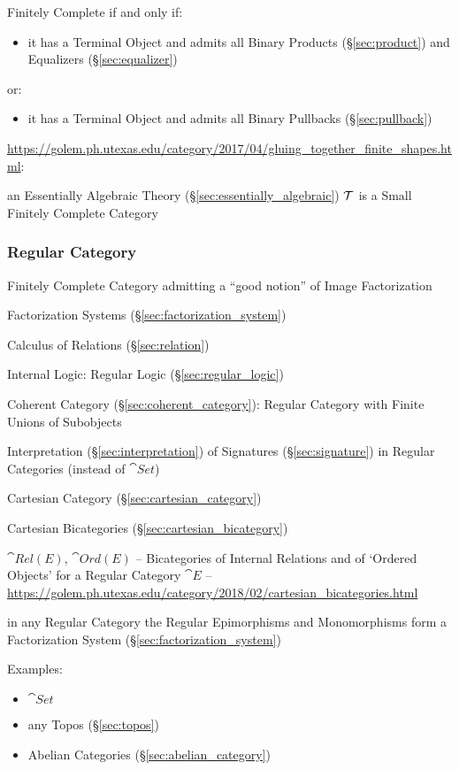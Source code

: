 Finitely Complete if and only if:
\begin{itemize}
  \item it has a Terminal Object and admits all Binary Products
    (\S\ref{sec:product}) and Equalizers (\S\ref{sec:equalizer})
\end{itemize}
or:
\begin{itemize}
  \item it has a Terminal Object and admits all Binary Pullbacks
    (\S\ref{sec:pullback})
\end{itemize}

\url{https://golem.ph.utexas.edu/category/2017/04/gluing_together_finite_shapes.html}:

an Essentially Algebraic Theory (\S\ref{sec:essentially_algebraic})
$\mathcal{T}$ is a Small Finitely Complete Category



\subsubsection{Regular Category}\label{sec:regular_category}

Finitely Complete Category admitting a ``good notion'' of Image
Factorization

\fist Factorization Systems (\S\ref{sec:factorization_system})

Calculus of Relations (\S\ref{sec:relation})

Internal Logic: Regular Logic (\S\ref{sec:regular_logic})

Coherent Category (\S\ref{sec:coherent_category}): Regular Category
with Finite Unions of Subobjects

Interpretation (\S\ref{sec:interpretation}) of Signatures
(\S\ref{sec:signature}) in Regular Categories (instead of $\cat{Set}$)

Cartesian Category (\S\ref{sec:cartesian_category})

Cartesian Bicategories (\S\ref{sec:cartesian_bicategory})

$\cat{Rel(E)}$, $\cat{Ord(E)}$ -- Bicategories of Internal Relations and of
`Ordered Objects' for a Regular Category $\cat{E}$
--\url{https://golem.ph.utexas.edu/category/2018/02/cartesian_bicategories.html}

in any Regular Category the Regular Epimorphisms and Monomorphisms
form a Factorization System (\S\ref{sec:factorization_system})

Examples:

\begin{itemize}
  \item $\cat{Set}$
  \item any Topos (\S\ref{sec:topos})
  \item Abelian Categories (\S\ref{sec:abelian_category})
\end{itemize}

